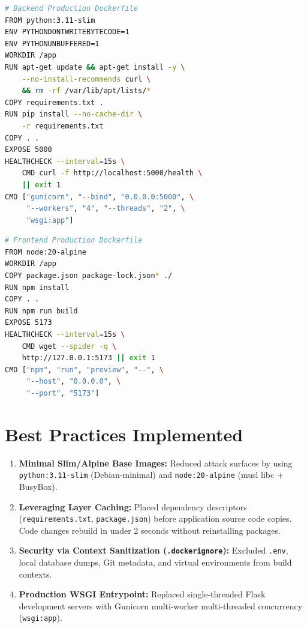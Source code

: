 \documentclass[11pt,a4paper]{report}
\begin{document}
\vspace{0.1cm}
\noindent
\begin{minipage}[t]{0.48\textwidth}
\begin{lstlisting}[language=bash]
# Backend Production Dockerfile
FROM python:3.11-slim
ENV PYTHONDONTWRITEBYTECODE=1
ENV PYTHONUNBUFFERED=1
WORKDIR /app
RUN apt-get update && apt-get install -y \
    --no-install-recommends curl \
    && rm -rf /var/lib/apt/lists/*
COPY requirements.txt .
RUN pip install --no-cache-dir \
    -r requirements.txt
COPY . .
EXPOSE 5000
HEALTHCHECK --interval=15s \
    CMD curl -f http://localhost:5000/health \
    || exit 1
CMD ["gunicorn", "--bind", "0.0.0.0:5000", \
     "--workers", "4", "--threads", "2", \
     "wsgi:app"]
\end{lstlisting}
\end{minipage}
\hfill
\begin{minipage}[t]{0.48\textwidth}
\begin{lstlisting}[language=bash]
# Frontend Production Dockerfile
FROM node:20-alpine
WORKDIR /app
COPY package.json package-lock.json* ./
RUN npm install
COPY . .
RUN npm run build
EXPOSE 5173
HEALTHCHECK --interval=15s \
    CMD wget --spider -q \
    http://127.0.0.1:5173 || exit 1
CMD ["npm", "run", "preview", "--", \
     "--host", "0.0.0.0", \
     "--port", "5173"]
\end{lstlisting}
\end{minipage}
\vspace{0.2cm}

\section{Best Practices Implemented}
\begin{enumerate}[itemsep=1pt,topsep=1pt]
    \item \textbf{Minimal Slim/Alpine Base Images:} Reduced attack surfaces by using \texttt{python:3.11-slim} (Debian-minimal) and \texttt{node:20-alpine} (musl libc + BusyBox).
    \item \textbf{Leveraging Layer Caching:} Placed dependency descriptors (\texttt{requirements.txt}, \texttt{package.json}) before application source code copies. Code changes rebuild in under 2 seconds without reinstalling packages.
    \item \textbf{Security via Context Sanitization (\texttt{.dockerignore}):} Excluded \texttt{.env}, local database dumps, Git metadata, and virtual environments from build contexts.
    \item \textbf{Production WSGI Entrypoint:} Replaced single-threaded Flask development servers with Gunicorn multi-worker multi-threaded concurrency (\texttt{wsgi:app}).
\end{enumerate}
\end{document}
